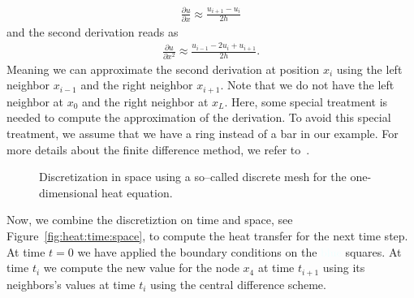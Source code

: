 \begin{align*}
\frac{\partial u}{\partial x} \approx \frac{u_{i+1}-u_{i}}{2h}
\end{align*}
and the second derivation reads as
\begin{align*}
\frac{\partial u}{\partial x^2} \approx \frac{u_{i-1}-2u_{i}+u_{i+1}}{2h}\text{.}
\end{align*}
Meaning we can approximate the second derivation at position $x_i$ using the left neighbor $x_{i-1}$ and the right neighbor $x_{i+1}$. Note that we do not have the left neighbor at $x_0$ and the right neighbor at $x_L$. Here, some special treatment is needed to compute the approximation of the derivation. To avoid this special treatment, we assume that we have a ring instead of a bar in our example. For more details about the finite difference method, we refer to~\cite{strikwerda2004finite,leveque2007finite}.
\begin{figure}[tb]
\center
{}
\caption{Discretization in space using a so--called discrete mesh for the one-dimensional heat equation.}
\label{fig:heat:discrete:mesh}
\end{figure}
Now, we combine the discretiztion on time and space, see Figure~\ref{fig:heat:time:space}, to compute the heat transfer for the next time step. At time $t=0$ we have applied the boundary conditions on the \textcolor{azure}{blue} squares. At time $t_i$ we compute the new value for the node $x_4$ at time $t_{i+1}$ using its neighbors's values at time $t_i$ using the central difference scheme. 

